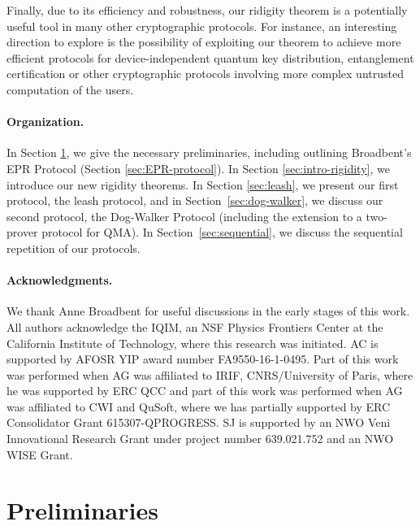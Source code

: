 Finally, due to its efficiency and robustness, our ridigity theorem is a
potentially useful tool in many other cryptographic protocols. For instance, an
interesting direction to explore is the possibility of exploiting our theorem to
achieve more efficient protocols for device-independent quantum key
distribution, entanglement certification or other cryptographic protocols
involving more complex untrusted computation of the users.




\paragraph{Organization.}
In Section \ref{sec:prelim}, we give the necessary preliminaries, including
outlining Broadbent's EPR Protocol (Section \ref{sec:EPR-protocol}). In Section
\ref{sec:intro-rigidity}, we introduce our new rigidity theorems. In Section
\ref{sec:leash}, we present our first protocol, the leash protocol, and in
Section~\ref{sec:dog-walker}, we discuss our second protocol, the
Dog-Walker Protocol (including the extension to a two-prover protocol for QMA). In Section~\ref{sec:sequential}, we discuss the sequential repetition of our protocols.



\paragraph{Acknowledgments.} We thank Anne Broadbent for useful discussions in the early stages of this work. All authors acknowledge the IQIM, an NSF Physics Frontiers Center at the California Institute of Technology, where this research was initiated.
AC is supported by AFOSR YIP award number FA9550-16-1-0495.
Part of this work was performed when AG was affiliated to IRIF, CNRS/University of Paris, where he was supported by ERC QCC and part of this work was performed when AG was affiliated to CWI and QuSoft, where we has partially supported by ERC Consolidator Grant 615307-QPROGRESS.
SJ is supported by an NWO Veni Innovational Research Grant under project number 639.021.752 and an NWO WISE Grant.




\section{Preliminaries}\label{sec:prelim}



